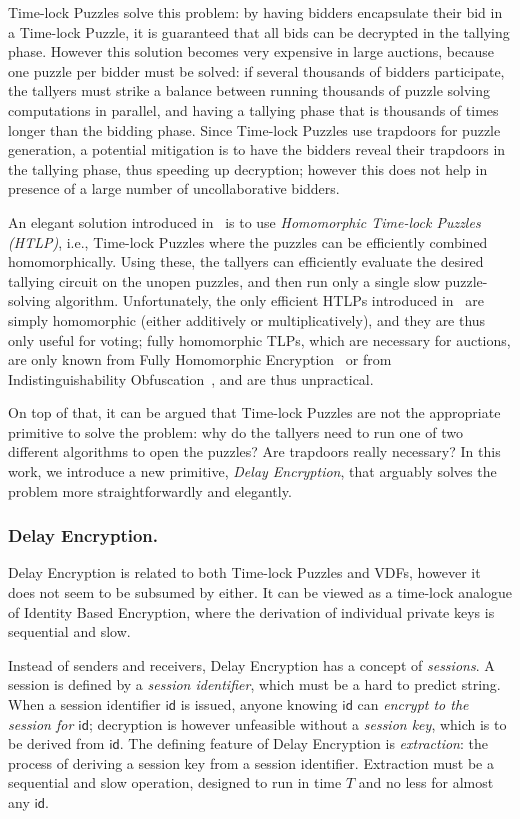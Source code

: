 \documentclass{llncs}
\newcommand{\id}{\mathsf{id}}
\begin{document}
Time-lock Puzzles solve this problem: by having bidders encapsulate
their bid in a Time-lock Puzzle, it is guaranteed that all bids can be
decrypted in the tallying phase. %
However this solution becomes very expensive in large auctions,
because one puzzle per bidder must be solved: if several thousands of
bidders participate, the tallyers must strike a balance between
running thousands of puzzle solving computations in parallel, and
having a tallying phase that is thousands of times longer than the
bidding phase. %
Since Time-lock Puzzles use trapdoors for puzzle generation, a
potential mitigation is to have the bidders reveal their trapdoors in
the tallying phase, thus speeding up decryption; however this does not
help in presence of a large number of uncollaborative bidders.

An elegant solution introduced in~\cite{C:MalThy19} is to use
\emph{Homomorphic Time-lock Puzzles (HTLP)}, i.e., Time-lock Puzzles
where the puzzles can be efficiently combined homomorphically. %
Using these, the tallyers can efficiently evaluate the desired
tallying circuit on the unopen puzzles, and then run only a single
slow puzzle-solving algorithm. %
Unfortunately, the only efficient HTLPs introduced
in~\cite{C:MalThy19} are simply homomorphic (either additively or
multiplicatively), and they are thus only useful for voting; fully
homomorphic TLPs, which are necessary for auctions, are only known
from Fully Homomorphic Encryption~\cite{10.1007/978-3-030-36033-7_16}
or from Indistinguishability Obfuscation~\cite{C:MalThy19}, and are
thus unpractical. %

On top of that, it can be argued that Time-lock Puzzles are not the
appropriate primitive to solve the problem: why do the tallyers need
to run one of two different algorithms to open the puzzles? Are
trapdoors really necessary? %
In this work, we introduce a new primitive, \emph{Delay Encryption},
that arguably solves the problem more straightforwardly and elegantly.


\subsubsection{Delay Encryption.}
Delay Encryption is related to both Time-lock Puzzles and VDFs,
however it does not seem to be subsumed by either. %
It can be viewed as a time-lock analogue of Identity Based Encryption,
where the derivation of individual private keys is sequential and
slow. %

Instead of senders and receivers, Delay Encryption has a concept of
\emph{sessions}. %
A session is defined by a \emph{session identifier}, which must be a
hard to predict string. %
When a session identifier $\id$ is issued, anyone knowing $\id$ can
\emph{encrypt to the session for $\id$}; decryption is however
unfeasible without a \emph{session key}, which is to be derived from
$\id$. %
The defining feature of Delay Encryption is \emph{extraction}: the
process of deriving a session key from a session identifier. %
Extraction must be a sequential and slow operation, designed to run in
time $T$ and no less for almost any $\id$.
\end{document}
